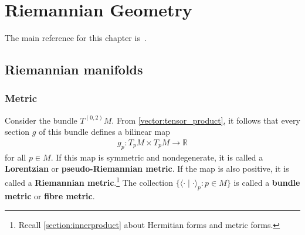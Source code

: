 \chapter{Riemannian Geometry}\label{chapter:riemann}

    The main reference for this chapter is~\cite{petersen_riemannian_2006}.

\section{Riemannian manifolds}
\subsection{Metric}

    \begin{definition}
        Consider the bundle $T^{(0,2)}M$. From \cref{vector:tensor_product}, it follows that every section $g$ of this bundle defines a bilinear map
        \begin{gather}
            g_p:T_pM\times T_pM\rightarrow\mathbb{R}
        \end{gather}
        for all $p\in M$. If this map is symmetric and nondegenerate, it is called a \textbf{Lorentzian} or \textbf{pseudo-Riemannian metric}. If the map is also positive, it is called a \textbf{Riemannian metric}.\footnote{Recall \cref{section:innerproduct} about Hermitian forms and metric forms.} The collection $\{\langle\cdot\mid\cdot\rangle_p:p\in M\}$ is called a \textbf{bundle metric} or \textbf{fibre metric}.
    \end{definition}

